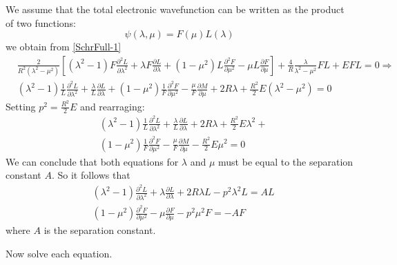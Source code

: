 We assume that the total electronic wavefunction can be written as the product of two functions:
\begin{equation}\label{variables2C}
\psi(\lambda,\mu) = F(\mu)L(\lambda)
\end{equation}
we obtain from \eqref{SchrFull-1}
\begin{equation}
\begin{split}
& \frac{2}{ R^2 (\lambda^2-\mu^2) }\left[(\lambda^2-1)F\frac{\partial^2 L}{\partial \lambda^2} + \lambda F\frac{\partial L}{\partial \lambda} + 
(1 - \mu^2)L\frac{\partial^2 F}{\partial \mu^2} - \mu L\frac{\partial F}{\partial \mu} \right] + \frac{4}{R}\frac{\lambda}{\lambda^2-\mu^2} F L + E F L = 0 \Rightarrow \\[.8em]
& (\lambda^2-1)\frac{1}{L}\frac{\partial^2 L}{\partial \lambda^2} + \frac{\lambda}{L}\frac{\partial L}{\partial \lambda} + 
(1 - \mu^2)\frac{1}{F}\frac{\partial^2 F}{\partial \mu^2} - \frac{\mu}{F} \frac{\partial M}{\partial \mu} + 2R\lambda + \frac{R^2}{2} E (\lambda^2 - \mu^2) = 0 
\end{split}
\end{equation}
Setting $ p^2 = \frac{R^2}{2}E $ and rearraging: \\[1.em]
\begin{equation}
\begin{split}
& (\lambda^2-1)\frac{1}{L}\frac{\partial^2 L}{\partial \lambda^2} + \frac{\lambda}{L}\frac{\partial L}{\partial \lambda} + 2R\lambda + \frac{R^2}{2} E \lambda^2 + \\[.8em]
& (1 - \mu^2)\frac{1}{F}\frac{\partial^2 F}{\partial \mu^2} - \frac{\mu}{F} \frac{\partial M}{\partial \mu} - \frac{R^2}{2} E \mu^2 = 0
\end{split}
\end{equation}
We can conclude that both equations for $ \lambda $ and $ \mu $ must be equal to the separation constant $ A $. So it follows that
\begin{equation}\label{eqLG}
\begin{split}
& (\lambda^2-1)\frac{\partial^2 L}{\partial \lambda^2} + \lambda\frac{\partial L}{\partial \lambda} + 2R\lambda L - p^2 \lambda^2 L = AL \\[.8em]
& (1 - \mu^2)\frac{\partial^2 F}{\partial \mu^2} - \mu\frac{\partial F}{\partial \mu} - p^2\mu^2 F = -AF
\end{split}
\end{equation}
where $ A $ is the separation constant.

Now solve each equation.

